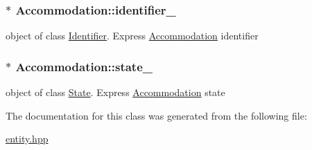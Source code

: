 \subsubsection[{\texorpdfstring{identifier\+\_\+}{identifier_}}]{$\ast$ Accommodation\+::identifier\+\_\+\hspace{0.3cm}{\ttfamily [private]}}\hypertarget{classAccommodation_a44fac71f51c582f9a8ef87810b5e52fc}{}\label{classAccommodation_a44fac71f51c582f9a8ef87810b5e52fc}
object of class \hyperlink{classIdentifier}{Identifier}. Express \hyperlink{classAccommodation}{Accommodation} identifier 
\subsubsection[{\texorpdfstring{state\+\_\+}{state_}}]{$\ast$ Accommodation\+::state\+\_\+\hspace{0.3cm}{\ttfamily [private]}}\hypertarget{classAccommodation_a32f0062a48593019f2c22c7c97404b37}{}\label{classAccommodation_a32f0062a48593019f2c22c7c97404b37}
object of class \hyperlink{classState}{State}. Express \hyperlink{classAccommodation}{Accommodation} state 

The documentation for this class was generated from the following file\+:\begin{DoxyCompactItemize}
\item 
\hyperlink{entity_8hpp}{entity.\+hpp}\end{DoxyCompactItemize}
